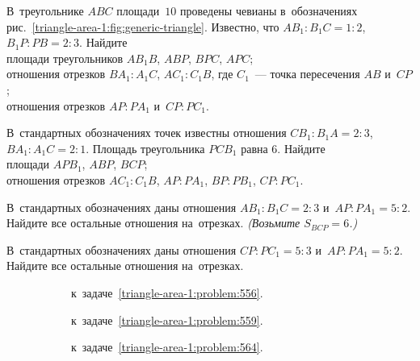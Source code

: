 \begin{problems}

\item
В~треугольнике $ABC$ площади~$10$ проведены чевианы в~обозначениях
рис.~\ref{triangle-area-1:fig:generic-triangle}.
Известно, что $A B_1 : B_1 C = 1 : 2$, $B_1 P : P B = 2 : 3$.
Найдите
\\
\subproblem
площади треугольников $A B_1 B$, $ABP$, $BPC$, $APC$;
\\
\subproblem
отношения отрезков $B A_1 : A_1 C$, $A C_1 : C_1 B$, где $C_1$~--- точка
пересечения $AB$ и~$CP$;
\\
\subproblem
отношения отрезков $AP : P A_1$ и~$CP : P C_1$.

\item
В~стандартных обозначениях точек известны отношения
$C B_1 : B_1 A = 2 : 3$, $B A_1 : A_1 C = 2 : 1$.
Площадь треугольника $P C B_1$ равна $6$.
Найдите
\\
\subproblem
площади $A P B_1$, $ABP$, $BCP$;
\\
\subproblem
отношения отрезков $A C_1 : C_1 B$, $AP : P A_1$, $BP : P B_1$, $CP : P C_1$.

\item
В~стандартных обозначениях даны отношения $A B_1 : B_1 C = 2 : 3$
и~$AP : P A_1 = 5 : 2$.
Найдите все остальные отношения на~отрезках.
\emph{(Возьмите $S_{BCP} = 6$.)}

\item
В~стандартных обозначениях даны отношения $CP : P C_1 = 5 : 3$
и~$AP : P A_1 = 5 : 2$.
Найдите все остальные отношения на~отрезках.

\begin{figure}[hb]
\leavevmode\null\hfill
    \begin{subfigure}{0.3\textwidth}
        \caption{к~задаче~\ref{triangle-area-1:problem:556}.}
        \label{triangle-area-1:problem:556:fig}
    \end{subfigure}
\hfill
    \begin{subfigure}{0.3\textwidth}
        \caption{к~задаче~\ref{triangle-area-1:problem:559}.}
        \label{triangle-area-1:problem:559:fig}
    \end{subfigure}
\hfill
    \begin{subfigure}{0.3\textwidth}
        \caption{к~задаче~\ref{triangle-area-1:problem:564}.}
        \label{triangle-area-1:problem:564:fig}
    \end{subfigure}
\hfill\null\par
    \caption{}
\end{figure}


\end{problems}
